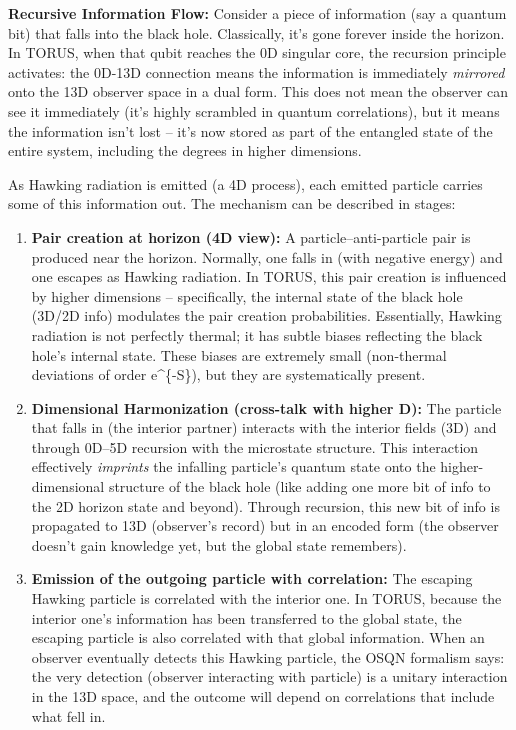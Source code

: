 \documentclass[]{article}
\begin{document}
\textbf{Recursive Information Flow:} Consider a piece of information
(say a quantum bit) that falls into the black hole. Classically, it's
gone forever inside the horizon. In TORUS, when that qubit reaches the
0D singular core, the recursion principle activates: the 0D-13D
connection means the information is immediately \emph{mirrored} onto the
13D observer space in a dual form. This does not mean the observer can
see it immediately (it's highly scrambled in quantum correlations), but
it means the information isn't lost -- it's now stored as part of the
entangled state of the entire system, including the degrees in higher
dimensions.

As Hawking radiation is emitted (a 4D process), each emitted particle
carries some of this information out. The mechanism can be described in
stages:

\begin{enumerate}
\def\labelenumi{\arabic{enumi}.}
\item
  \textbf{Pair creation at horizon (4D view):} A particle--anti-particle
  pair is produced near the horizon. Normally, one falls in (with
  negative energy) and one escapes as Hawking radiation. In TORUS, this
  pair creation is influenced by higher dimensions -- specifically, the
  internal state of the black hole (3D/2D info) modulates the pair
  creation probabilities. Essentially, Hawking radiation is not
  perfectly thermal; it has subtle biases reflecting the black hole's
  internal state. These biases are extremely small (non-thermal
  deviations of order e\^{}\{-S\}), but they are systematically present.
\item
  \textbf{Dimensional Harmonization (cross-talk with higher D):} The
  particle that falls in (the interior partner) interacts with the
  interior fields (3D) and through 0D--5D recursion with the microstate
  structure. This interaction effectively \emph{imprints} the infalling
  particle's quantum state onto the higher-dimensional structure of the
  black hole (like adding one more bit of info to the 2D horizon state
  and beyond). Through recursion, this new bit of info is propagated to
  13D (observer's record) but in an encoded form (the observer doesn't
  gain knowledge yet, but the global state remembers).
\item
  \textbf{Emission of the outgoing particle with correlation:} The
  escaping Hawking particle is correlated with the interior one. In
  TORUS, because the interior one's information has been transferred to
  the global state, the escaping particle is also correlated with that
  global information. When an observer eventually detects this Hawking
  particle, the OSQN formalism says: the very detection (observer
  interacting with particle) is a unitary interaction in the 13D space,
  and the outcome will depend on correlations that include what fell in.
\end{enumerate}
\end{document}
